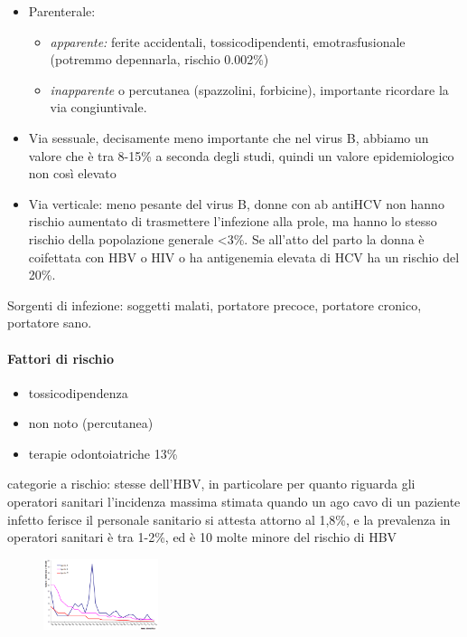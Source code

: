 \begin{itemize}
\item
Parenterale:
\begin{itemize}
\item \emph{apparente:} ferite accidentali, tossicodipendenti, emotrasfusionale (potremmo depennarla, rischio 0.002\%)
\item \emph{inapparente} o percutanea (spazzolini, forbicine), importante ricordare la via congiuntivale.
\end{itemize}
\item
  Via sessuale, decisamente meno importante che nel virus B, abbiamo un valore che è tra 8-15\% a seconda degli studi, quindi un valore epidemiologico non così elevato
\item
  Via verticale: meno pesante del virus B, donne con ab antiHCV non hanno rischio aumentato di trasmettere l'infezione alla prole, ma hanno lo stesso rischio della popolazione generale <3\%. Se all'atto del parto la donna è coifettata con HBV o HIV o ha antigenemia elevata di HCV ha un rischio del 20\%.
\end{itemize}
 
  Sorgenti di infezione: soggetti malati, portatore precoce, portatore
  cronico, portatore sano.

\paragraph{Fattori di rischio}

\begin{itemize}
\item
  tossicodipendenza
\item
  non noto (percutanea)
\item
  terapie odontoiatriche 13\%
\end{itemize}
  categorie a rischio: stesse dell'HBV, in particolare per quanto
  riguarda gli operatori sanitari l'incidenza massima stimata quando un
  ago cavo di un paziente infetto ferisce il personale sanitario si
  attesta attorno al 1,8\%, e la prevalenza in operatori sanitari è tra
  1-2\%, ed è 10 molte minore del rischio di HBV

\begin{figure}[!ht]
\centering
	\includegraphics[width=0.3\textwidth]{11/image5.png}
	\end{figure}
  
